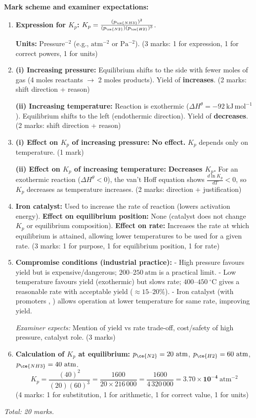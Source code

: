 \documentclass[11pt]{article}
\begin{document}
\begin{corrige}
\textbf{Mark scheme and examiner expectations:}
\begin{enumerate}
\item \textbf{Expression for $K_p$:} $K_p = \frac{(p_{\ce{NH3}})^2}{(p_{\ce{N2}})(p_{\ce{H2}})^3}$.
\par \textbf{Units:} Pressure$^{-2}$ (e.g., $\mathrm{atm^{-2}}$ or $\mathrm{Pa^{-2}}$). \hfill (3 marks: 1 for expression, 1 for correct powers, 1 for units)
\item \textbf{(i) Increasing pressure:} Equilibrium shifts to the side with fewer moles of gas (4 moles reactants $\to$ 2 moles products). Yield of  \textbf{increases}. \hfill (2 marks: shift direction + reason)
\par \textbf{(ii) Increasing temperature:} Reaction is exothermic ($\Delta H^\theta = -92\ \mathrm{kJ\,mol^{-1}}$). Equilibrium shifts to the left (endothermic direction). Yield of  \textbf{decreases}. \hfill (2 marks: shift direction + reason)
\item \textbf{(i) Effect on $K_p$ of increasing pressure:} \textbf{No effect.} $K_p$ depends only on temperature. \hfill (1 mark)
\par \textbf{(ii) Effect on $K_p$ of increasing temperature:} \textbf{Decreases $K_p$.} For an exothermic reaction ($\Delta H^\theta < 0$), the van't Hoff equation shows $\frac{d\ln K_p}{dT} < 0$, so $K_p$ decreases as temperature increases. \hfill (2 marks: direction + justification)
\item \textbf{Iron catalyst:} Used to increase the rate of reaction (lowers activation energy). \textbf{Effect on equilibrium position:} None (catalyst does not change $K_p$ or equilibrium composition). \textbf{Effect on rate:} Increases the rate at which equilibrium is attained, allowing lower temperatures to be used for a given rate. \hfill (3 marks: 1 for purpose, 1 for equilibrium position, 1 for rate)
\item \textbf{Compromise conditions (industrial practice):} 
- High pressure favours yield but is expensive/dangerous; $200\text{--}250\ \mathrm{atm}$ is a practical limit.
- Low temperature favours yield (exothermic) but slows rate; $400\text{--}450\ ^\circ\mathrm{C}$ gives a reasonable rate with acceptable yield ($\approx 15\text{--}20\%$).
- Iron catalyst (with promoters , ) allows operation at lower temperature for same rate, improving yield.
\par \emph{Examiner expects:} Mention of yield vs rate trade-off, cost/safety of high pressure, catalyst role. \hfill (3 marks)
\item \textbf{Calculation of $K_p$ at equilibrium:}
$p_{\ce{N2}} = 20\ \mathrm{atm}$, $p_{\ce{H2}} = 60\ \mathrm{atm}$, $p_{\ce{NH3}} = 40\ \mathrm{atm}$.
\[
K_p = \frac{(40)^2}{(20)(60)^3} = \frac{1600}{20 \times 216\,000} = \frac{1600}{4\,320\,000} = \mathbf{3.70\times 10^{-4}\ \mathrm{atm^{-2}}}
\]
\hfill (4 marks: 1 for substitution, 1 for arithmetic, 1 for correct value, 1 for units)
\end{enumerate}
\emph{Total: 20 marks.}
\end{corrige}
\end{document}
